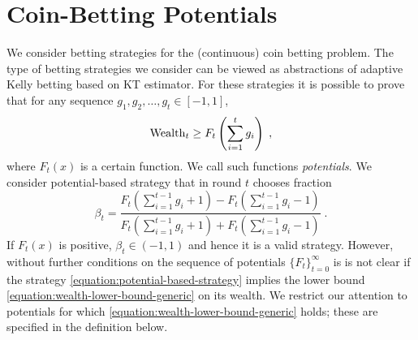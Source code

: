 \section{Coin-Betting Potentials}
\label{section:coin-betting-potentials}

We consider betting strategies for the (continuous) coin betting problem. The
type of betting strategies we consider can be viewed as abstractions of
adaptive Kelly betting based on KT estimator. For these strategies it is
possible to prove that for any sequence $g_1, g_2, \dots, g_t \in [-1,1]$,
\begin{equation}
\label{equation:wealth-lower-bound-generic}
\operatorname{Wealth}_t \ge F_t \left( \sum_{i=1}^t g_i \right) \; ,
\end{equation}
where $F_t(x)$ is a certain function. We call such functions \emph{potentials}.
We consider potential-based strategy that in round $t$ chooses fraction
\begin{equation}
\label{equation:potential-based-strategy}
\beta_t = \frac{F_t(\sum_{i=1}^{t-1} g_i + 1) - F_t(\sum_{i=1}^{t-1} g_i - 1)}{F_t(\sum_{i=1}^{t-1} g_i + 1) + F_t(\sum_{i=1}^{t-1} g_i - 1)} \; .
\end{equation}
If $F_t(x)$ is positive, $\beta_t \in (-1,1)$ and hence it is a valid
strategy. However, without further conditions on the sequence of potentials
$\{F_t\}_{t=0}^\infty$ is is not clear if the strategy
\eqref{equation:potential-based-strategy} implies the lower bound
\eqref{equation:wealth-lower-bound-generic} on its wealth. We restrict our
attention to potentials for which \eqref{equation:wealth-lower-bound-generic}
holds; these are specified in the definition below.

